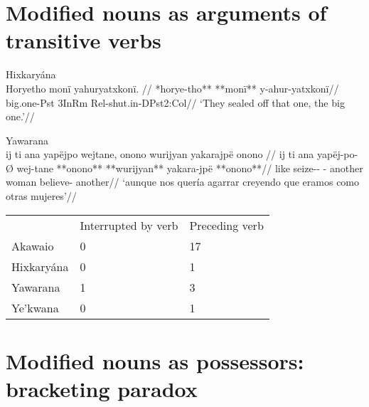 \documentclass[10pt]{article}
\begin{document}
\section{Modified nouns as arguments of transitive verbs}

\ex Hixkaryána \parencite[60]{derbyshire1965textos} \\
\label{derbyshire-1965-p-060-the-wives-of-mawarye-and-woxka-005}    \begingl
    \glpreamble Horyetho monï yahuryatxkonï. //
    \gla **horye-tho** **monï** y-ahur-yatxkonï//
    \glb big.one-Pst 3InRm Rel-shut.in-DPst2:Col//
        \glft ‘They sealed off that one, the big one.’//  
    \endgl 
\xe

\ex Yawarana \parencite{caceres2020flex} \\
\label{conv1stenc-78}    \begingl
    \glpreamble ij ti ana yapëjpo wejtane, onono wurijyan yakarajpë onono //
    \gla ij ti ana yapëj-po-Ø wej-tane **onono** **wurijyan** yakara-jpë **onono**//
    \glb {} like  seize-- - another woman believe- another//
        \glft ‘aunque nos quería agarrar creyendo que eramos como otras mujeres’//  
    \endgl 
\xe

\begin{tabular}[t]{lll}

           & Interrupted by verb & Preceding verb \\

   Akawaio &                   0 &             17 \\
Hixkaryána &                   0 &              1 \\
  Yawarana &                   1 &              3 \\
  Ye'kwana &                   0 &              1 \\

\end{tabular}

\section{Modified nouns as possessors: bracketing paradox}
\end{document}
